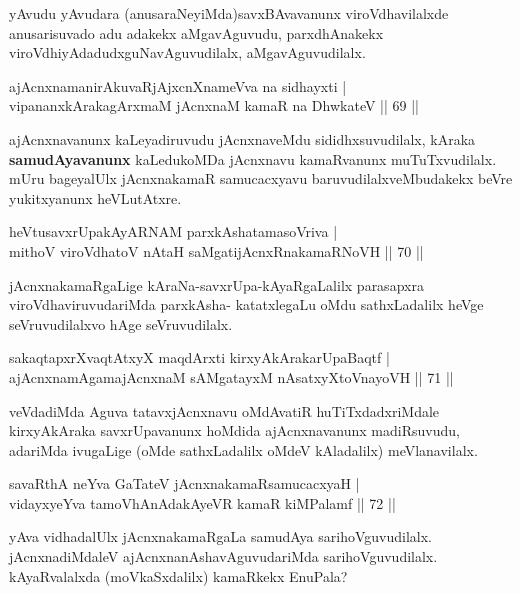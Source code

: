 \begin{artha}
yAvudu yAvudara (anusaraNeyiMda)savxBAvavanunx viroVdhavilalxde anusarisuvado adu adakekx aMgavAguvudu, parxdhAnakekx viroVdhiyAdadudxguNavAguvudilalx, aMgavAguvudilalx.
\end{artha}

\begin{shl}
ajAcnxnamanirAkuvaRjAjxcnXnameVva na sidhayxti |\\
vipananxkArakagArxmaM jAcnxnaM kamaR na DhwkateV \hfill || 69 ||
\end{shl}

\begin{artha}
ajAcnxnavanunx kaLeyadiruvudu jAcnxnaveMdu sididhxsuvudilalx, kAraka \textbf{samudAyavanunx} kaLedukoMDa jAcnxnavu kamaRvanunx muTuTxvudilalx. mUru bageyalUlx jAcnxnakamaR samucacxyavu baruvudilalxveMbudakekx beVre yukitxyanunx heVLutAtxre.
\end{artha}

\begin{shl}
heVtusavxrUpakAyARNAM parxkAshatamasoVriva |\\
mithoV viroVdhatoV nAtaH saMgatijAcnxRnakamaRNoVH \hfill || 70 ||
\end{shl}

\begin{artha}
jAcnxnakamaRgaLige kAraNa-savxrUpa-kAyaRgaLalilx parasapxra viroVdhaviruvudariMda parxkAsha- katatxlegaLu oMdu sathxLadalilx heVge seVruvudilalxvo hAge seVruvudilalx.
\end{artha}

\begin{shl}
sakaqtapxrXvaqtAtxyX maqdArxti kirxyAkArakarUpaBaqtf |\\
ajAcnxnamAgamajAcnxnaM sAMgatayxM nAsatxyXtoV\s nayoVH \hfill || 71 ||
\end{shl}

\begin{artha}
veVdadiMda Aguva tatavxjAcnxnavu oMdAvatiR huTiTxdadxriMdale kirxyAkAraka savxrUpavanunx hoMdida ajAcnxnavanunx madiRsuvudu, adariMda ivugaLige (oMde sathxLadalilx oMdeV kAladalilx) meVlanavilalx.
\end{artha}

\begin{shl}
savaRthA neYva GaTateV jAcnxnakamaRsamucacxyaH |\\
vidayxyeYva tamoVhAnAdakAyeVR kamaR kiMPalamf \hfill || 72 ||
\end{shl}

\begin{artha}
yAva vidhadalUlx jAcnxnakamaRgaLa samudAya sarihoVguvudilalx. jAcnxnadiMdaleV ajAcnxnanAshavAguvudariMda sarihoVguvudilalx. kAyaRvalalxda (moVkaSxdalilx) kamaRkekx EnuPala?
\end{artha}

